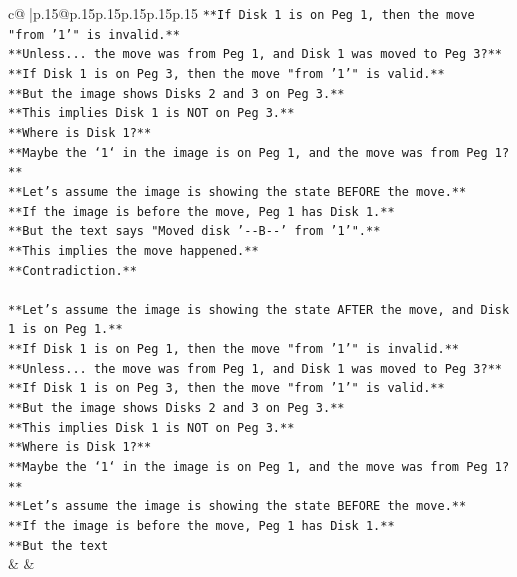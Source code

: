 \documentclass{article}
\begin{document}
{\begin{supertabular}{c@{$\;$}|p{.15\linewidth}@{}p{.15\linewidth}p{.15\linewidth}p{.15\linewidth}p{.15\linewidth}p{.15\linewidth}}
{{{\texttt{**If Disk 1 is on Peg 1, then the move "from '1'" is invalid.**} \\
\texttt{**Unless... the move was from Peg 1, and Disk 1 was moved to Peg 3?**} \\
\texttt{**If Disk 1 is on Peg 3, then the move "from '1'" is valid.**} \\
\texttt{**But the image shows Disks 2 and 3 on Peg 3.**} \\
\texttt{**This implies Disk 1 is NOT on Peg 3.**} \\
\texttt{**Where is Disk 1?**} \\
\texttt{**Maybe the `1` in the image is on Peg 1, and the move was from Peg 1?**} \\
\texttt{**Let's assume the image is showing the state BEFORE the move.**} \\
\texttt{**If the image is before the move, Peg 1 has Disk 1.**} \\
\texttt{**But the text says "Moved disk '{-}{-}B{-}{-}' from '1'".**} \\
\texttt{**This implies the move happened.**} \\
\texttt{**Contradiction.**} \\
\\ 
\texttt{**Let's assume the image is showing the state AFTER the move, and Disk 1 is on Peg 1.**} \\
\texttt{**If Disk 1 is on Peg 1, then the move "from '1'" is invalid.**} \\
\texttt{**Unless... the move was from Peg 1, and Disk 1 was moved to Peg 3?**} \\
\texttt{**If Disk 1 is on Peg 3, then the move "from '1'" is valid.**} \\
\texttt{**But the image shows Disks 2 and 3 on Peg 3.**} \\
\texttt{**This implies Disk 1 is NOT on Peg 3.**} \\
\texttt{**Where is Disk 1?**} \\
\texttt{**Maybe the `1` in the image is on Peg 1, and the move was from Peg 1?**} \\
\texttt{**Let's assume the image is showing the state BEFORE the move.**} \\
\texttt{**If the image is before the move, Peg 1 has Disk 1.**} \\
\texttt{**But the text} \\
            }
        }
    }
    & & \\ \\


\end{supertabular}}
\end{document}
